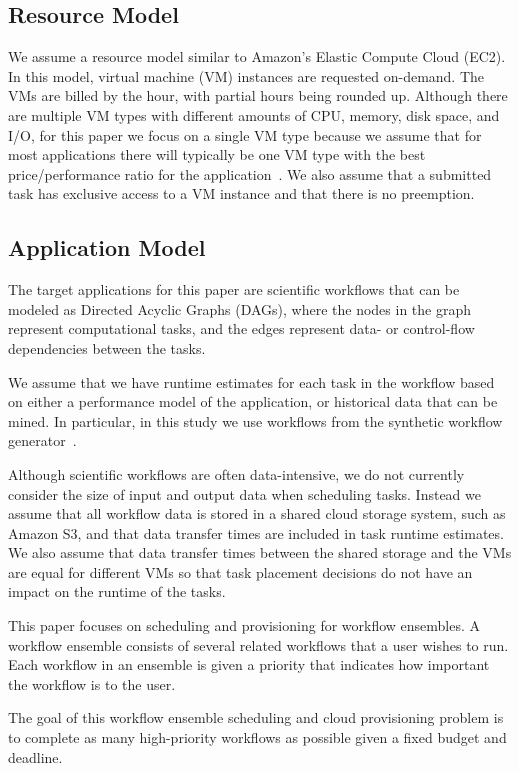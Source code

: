 \documentclass{sig-alternate}
\begin{document}
\subsection{Resource Model}

We assume a resource model similar to Amazon's Elastic Compute Cloud (EC2). In
this model, virtual machine (VM) instances are requested on-demand. The VMs are
billed by the hour, with partial hours being rounded up. Although there are
multiple VM types with different amounts of CPU, memory, disk space, and I/O,
for this paper we focus on a single VM type because we assume that for most
applications there will typically be one VM type with the best price/performance
ratio for the application~\cite{Juve2009}. We also assume that a submitted task
has exclusive access to a VM instance and that there is no preemption.


\subsection{Application Model}
The target applications for this paper are scientific workflows that can be
modeled as Directed Acyclic Graphs (DAGs), where the nodes in the graph
represent computational tasks, and the edges represent data- or control-flow
dependencies between the tasks.


We assume that we have runtime estimates for each task in the workflow based on
either a performance model of the application, or historical data that can be
mined. In particular, in this study we use workflows from the synthetic workflow
generator~\cite{Bharathi08}.


Although scientific workflows are often data-intensive, we do not currently
consider the size of input and output data when scheduling tasks. Instead we
assume that all workflow data is stored in a shared cloud storage system, such
as Amazon S3, and that data transfer times are included in task runtime
estimates. We also assume that data transfer times between the shared storage
and the VMs are equal for different VMs so that task placement decisions do not
have an impact on the runtime of the tasks.


This paper focuses on scheduling and provisioning for workflow ensembles. A
workflow ensemble consists of several related workflows that a user wishes to
run. Each workflow in an ensemble is given a priority that indicates how
important the workflow is to the user.


The goal of this workflow ensemble scheduling and cloud provisioning problem is
to complete as many high-priority workflows as possible given a fixed budget and
deadline.
\end{document}
